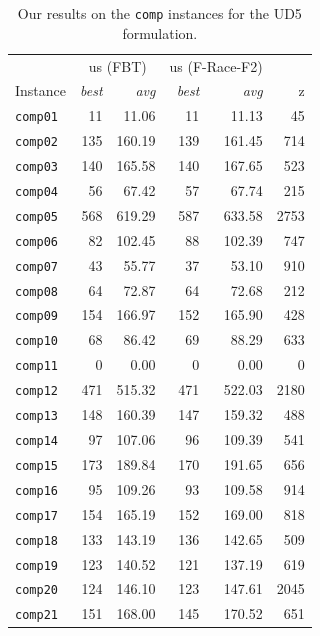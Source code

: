 \documentclass[authoryear,12pt]{article}
\begin{document}
    \begin{table}[htdp]
    \begin{scriptsize}
    \caption{Our results on the  \texttt{comp} instances for the UD5 formulation.}
     \label{tab:results-UD5}
    \begin{center}
    \begin{tabular}{l|rr|rr|r}
  \toprule
                 & \multicolumn{2}{c|}{us (FBT)}   & \multicolumn{2}{c|}{us (F-Race-F2)}   & \multicolumn{1}{c}{\citet{MSTIS13}}    \\
 Instance &  \emph{best} & \emph{avg} & \emph{best} & \emph{avg} & z \\
  \midrule
\texttt{comp01} & 11 & 11.06 & 11 & 11.13 & 45 \\
\texttt{comp02} & 135 & 160.19 & 139 & 161.45 & 714 \\
\texttt{comp03} & 140 & 165.58 & 140 & 167.65 & 523 \\
\texttt{comp04} & 56 & 67.42 & 57 & 67.74 & 215 \\
\texttt{comp05} & 568 & 619.29 & 587 & 633.58 & 2753 \\
\texttt{comp06} & 82 & 102.45 & 88 & 102.39 & 747 \\
\texttt{comp07} & 43 & 55.77 & 37 & 53.10 & 910 \\
\texttt{comp08} & 64 & 72.87 & 64 & 72.68 & 212 \\
\texttt{comp09} & 154 & 166.97 & 152 & 165.90 & 428 \\
\texttt{comp10} & 68 & 86.42 & 69 & 88.29 & 633 \\
\texttt{comp11} & 0 & 0.00 & 0 & 0.00 & 0 \\
\texttt{comp12} & 471 & 515.32 & 471 & 522.03 & 2180 \\
\texttt{comp13} & 148 & 160.39 & 147 & 159.32 & 488 \\
\texttt{comp14} & 97 & 107.06 & 96 & 109.39 & 541 \\
\texttt{comp15} & 173 & 189.84 & 170 & 191.65 & 656 \\
\texttt{comp16} & 95 & 109.26 & 93 & 109.58 & 914 \\
\texttt{comp17} & 154 & 165.19 & 152 & 169.00 & 818 \\
\texttt{comp18} & 133 & 143.19 & 136 & 142.65 & 509 \\
\texttt{comp19} & 123 & 140.52 & 121 & 137.19 & 619 \\
\texttt{comp20} & 124 & 146.10 & 123 & 147.61 & 2045 \\
\texttt{comp21} & 151 & 168.00 & 145 & 170.52 & 651 \\
 \bottomrule
   \end{tabular}
    \end{center}
    \end{scriptsize}
    \end{table}%
\end{document}

